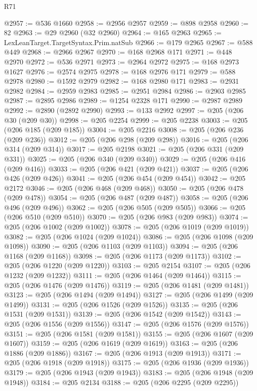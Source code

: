 \begin{lexlean}{R71}
\begin{coremodule}
@2957 := @536 @1660
@2958 := @2956 @2957
@2959 := @898 @2958
@2960 := 82
@2963 := @29 @2960 (@32 @2960)
@2964 := @165 @2963
@2965 := LexLeanTarget.TargetSyntax.Prim.natSub
@2966 := @179 @2965
@2967 := @588 @449
@2968 := @2966 @2967
@2970 := @168 @2968 @171
@2971 := @448 @2970
@2972 := @536 @2971
@2973 := @2964 @2972
@2975 := @168 @2973 @1627
@2976 := @2574 @2975
@2978 := @168 @2976 @171
@2979 := @588 @2978
@2980 := @1592 @2979
@2982 := @168 @2980 @171
@2983 := @2931 @2982
@2984 := @2959 @2983
@2985 := @2951 @2984
@2986 := @2903 @2985
@2987 := @2895 @2986
@2989 := @1254 @2328 @171
@2990 := @2987 @2989
@2992 := @2890 (@2892 @2990)
@2993 := @133 @2992
@2997 := @205 (@206 @30 (@209 @30))
@2998 := @205 @2254
@2999 := @205 @2238
@3003 := @205 (@206 @185 (@209 @185))
@3004 := @205 @2216
@3008 := @205 (@206 @236 (@209 @236))
@3012 := @205 (@206 @298 (@209 @298))
@3016 := @205 (@206 @314 (@209 @314))
@3017 := @205 @2198
@3021 := @205 (@206 @331 (@209 @331))
@3025 := @205 (@206 @340 (@209 @340))
@3029 := @205 (@206 @416 (@209 @416))
@3033 := @205 (@206 @421 (@209 @421))
@3037 := @205 (@206 @426 (@209 @426))
@3041 := @205 (@206 @454 (@209 @454))
@3042 := @205 @2172
@3046 := @205 (@206 @468 (@209 @468))
@3050 := @205 (@206 @478 (@209 @478))
@3054 := @205 (@206 @487 (@209 @487))
@3058 := @205 (@206 @496 (@209 @496))
@3062 := @205 (@206 @505 (@209 @505))
@3066 := @205 (@206 @510 (@209 @510))
@3070 := @205 (@206 @983 (@209 @983))
@3074 := @205 (@206 @1002 (@209 @1002))
@3078 := @205 (@206 @1019 (@209 @1019))
@3082 := @205 (@206 @1024 (@209 @1024))
@3086 := @205 (@206 @1098 (@209 @1098))
@3090 := @205 (@206 @1103 (@209 @1103))
@3094 := @205 (@206 @1168 (@209 @1168))
@3098 := @205 (@206 @1173 (@209 @1173))
@3102 := @205 (@206 @1220 (@209 @1220))
@3103 := @205 @2154
@3107 := @205 (@206 @1232 (@209 @1232))
@3111 := @205 (@206 @1464 (@209 @1464))
@3115 := @205 (@206 @1476 (@209 @1476))
@3119 := @205 (@206 @1481 (@209 @1481))
@3123 := @205 (@206 @1494 (@209 @1494))
@3127 := @205 (@206 @1499 (@209 @1499))
@3131 := @205 (@206 @1526 (@209 @1526))
@3135 := @205 (@206 @1531 (@209 @1531))
@3139 := @205 (@206 @1542 (@209 @1542))
@3143 := @205 (@206 @1556 (@209 @1556))
@3147 := @205 (@206 @1576 (@209 @1576))
@3151 := @205 (@206 @1581 (@209 @1581))
@3155 := @205 (@206 @1607 (@209 @1607))
@3159 := @205 (@206 @1619 (@209 @1619))
@3163 := @205 (@206 @1886 (@209 @1886))
@3167 := @205 (@206 @1913 (@209 @1913))
@3171 := @205 (@206 @1918 (@209 @1918))
@3175 := @205 (@206 @1936 (@209 @1936))
@3179 := @205 (@206 @1943 (@209 @1943))
@3183 := @205 (@206 @1948 (@209 @1948))
@3184 := @205 @2134
@3188 := @205 (@206 @2295 (@209 @2295))

\end{coremodule}
\end{lexlean}
